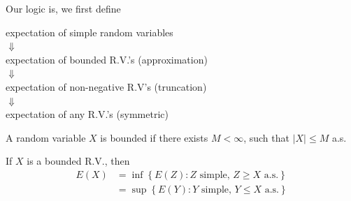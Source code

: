 Our logic is, we first define
\begin{center}
    expectation of simple random variables
    \\$\Downarrow$
    \\expectation of bounded R.V.'s (approximation)
    \\$\Downarrow$
    \\expectation of non-negative R.V's (truncation)
    \\$\Downarrow$
    \\expectation of any R.V.'s (symmetric)
\end{center}

\begin{definition}
    A random variable $X$ is bounded if there exists
    $M< \infty$, such that $|X|\leq M$ a.s.
\end{definition}

\begin{definition}
    If $X$ is a bounded R.V., then
    \begin{align*}
        E(X) &= \inf\left\{ E(Z): Z \text{ simple, }Z \geq X \text{ a.s.}\right\}\\
        &= \sup\left\{E(Y): Y \text{ simple, }Y \leq X \text{ a.s.}\right\}
    \end{align*}
\end{definition}


